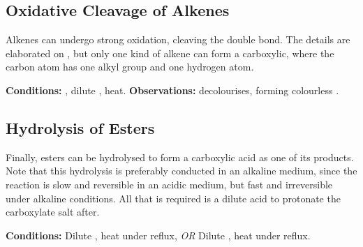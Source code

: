 


		\subsection{Oxidative Cleavage of Alkenes}

			Alkenes can undergo strong oxidation, cleaving the double bond. The details are elaborated on
			\hyperlink{OxidativeCleavageOfAlkenes}{}, but only one kind of alkene can form a carboxylic, where the carbon
			atom has one alkyl group and one hydrogen atom.

			\vspace{1.5em}
			\vbox{\textbf{Conditions:}	\tabto{35mm}, dilute , heat.}	%
			\vbox{\textbf{Observations:}  decolourises, forming colourless .}





		\pagebreak
		\subsection{Hydrolysis of Esters}

			Finally, esters can be hydrolysed to form a carboxylic acid as one of its products. Note that this hydrolysis is preferably
			conducted in an alkaline medium, since the reaction is slow and reversible in an acidic medium, but fast and irreversible under
			alkaline conditions. All that is required is a dilute acid to protonate the carboxylate salt after.


			\vspace{1.5em}
			\vbox{\textbf{Conditions:}	\tabto{35mm}Dilute , heat under reflux, \textit{OR}
										\tabto{35mm}Dilute , heat under reflux.}


